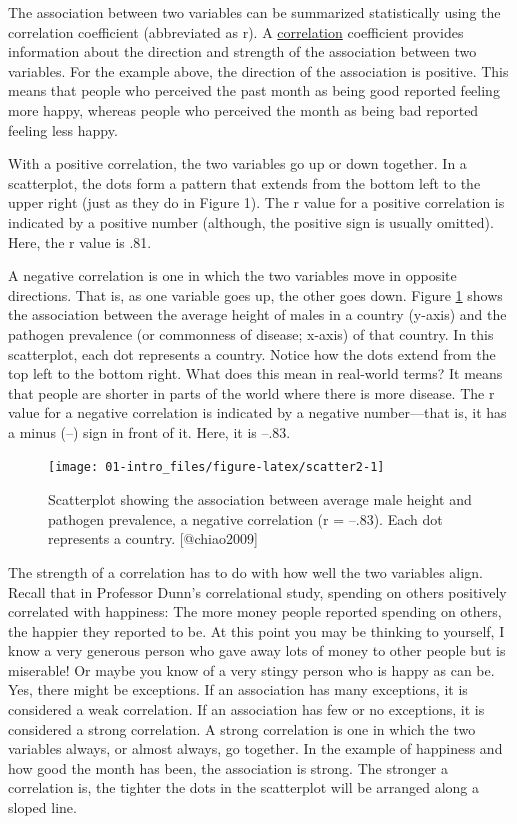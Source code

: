 \documentclass[
]{krantz}
\begin{document}
The association between two variables can be summarized statistically using the correlation coefficient (abbreviated as r). A \hyperref[correlation]{correlation} coefficient provides information about the direction and strength of the association between two variables. For the example above, the direction of the association is positive. This means that people who perceived the past month as being good reported feeling more happy, whereas people who perceived the month as being bad reported feeling less happy.

With a positive correlation, the two variables go up or down together. In a scatterplot, the dots form a pattern that extends from the bottom left to the upper right (just as they do in Figure 1). The r value for a positive correlation is indicated by a positive number (although, the positive sign is usually omitted). Here, the r value is .81.

A negative correlation is one in which the two variables move in opposite directions. That is, as one variable goes up, the other goes down. Figure \ref{fig:scatter2} shows the association between the average height of males in a country (y-axis) and the pathogen prevalence (or commonness of disease; x-axis) of that country. In this scatterplot, each dot represents a country. Notice how the dots extend from the top left to the bottom right. What does this mean in real-world terms? It means that people are shorter in parts of the world where there is more disease. The r value for a negative correlation is indicated by a negative number---that is, it has a minus (--) sign in front of it. Here, it is --.83.

\begin{figure}

{\centering \texttt{[image: 01-intro\_files/figure-latex/scatter2-1]} 

}

\caption{Scatterplot showing the association between average male height and pathogen prevalence, a negative correlation (r = –.83). Each dot represents a country. [@chiao2009]}\label{fig:scatter2}
\end{figure}

The strength of a correlation has to do with how well the two variables align. Recall that in Professor Dunn's correlational study, spending on others positively correlated with happiness: The more money people reported spending on others, the happier they reported to be. At this point you may be thinking to yourself, I know a very generous person who gave away lots of money to other people but is miserable! Or maybe you know of a very stingy person who is happy as can be. Yes, there might be exceptions. If an association has many exceptions, it is considered a weak correlation. If an association has few or no exceptions, it is considered a strong correlation. A strong correlation is one in which the two variables always, or almost always, go together. In the example of happiness and how good the month has been, the association is strong. The stronger a correlation is, the tighter the dots in the scatterplot will be arranged along a sloped line.
\end{document}
